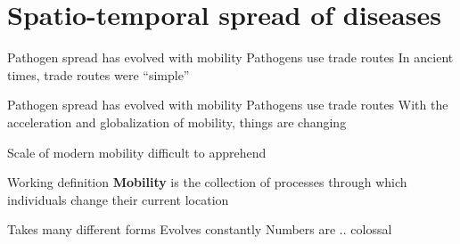 \documentclass[aspectratio=43]{beamer}
\begin{document}
\begin{frame}
    \tableofcontents[hideallsubsections]
\end{frame}
\addtocounter{page}{-1}

\section{Spatio-temporal spread of diseases}

\begin{frame}{Pathogen spread has evolved with mobility}
Pathogens use trade routes 
\vfill 
In ancient times, trade routes were ``simple''
\end{frame}



\begin{frame}{Pathogen spread has evolved with mobility}
Pathogens use trade routes 
\vfill 
With the acceleration and globalization of mobility, things are changing
\end{frame}


\begin{frame}{Scale of modern mobility difficult to apprehend}
\begin{block}{Working definition}
\textbf{Mobility} is the collection of processes through which individuals change their current location
\end{block}
\vfill
Takes many different forms \vfill Evolves constantly \vfill  Numbers are
.. colossal
\end{frame}

\end{document}
